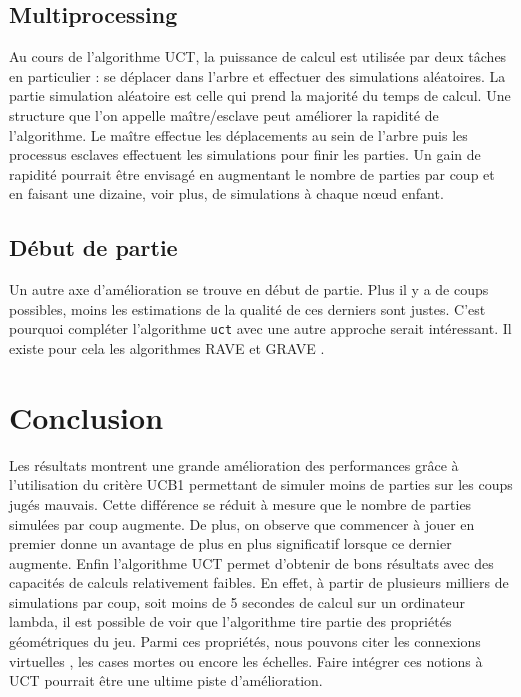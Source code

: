 \documentclass[a4paper]{article}
\theoremstyle{definition}
\begin{document}
\subsection{Multiprocessing}

Au cours de l'algorithme UCT, la puissance de calcul est utilisée par deux tâches en particulier : se déplacer dans l'arbre et effectuer des simulations aléatoires. La partie simulation aléatoire est celle qui prend la majorité du temps de calcul. Une structure que l'on appelle maître/esclave peut améliorer la rapidité de l'algorithme. Le maître effectue les déplacements au sein de l'arbre puis les processus esclaves effectuent les simulations pour finir les parties. Un gain de rapidité pourrait être envisagé en augmentant le nombre de parties par coup et en faisant une dizaine, voir plus, de simulations à chaque nœud enfant.

\subsection{Début de partie}

Un autre axe d'amélioration se trouve en début de partie. Plus il y a de coups possibles, moins les estimations de la qualité de ces derniers sont justes. C'est pourquoi compléter l'algorithme \texttt{uct} avec une autre approche serait intéressant. Il existe pour cela les algorithmes RAVE et GRAVE \cite{rave} \cite{grave}.

\newpage

\section{Conclusion}

Les résultats montrent une grande amélioration des performances grâce à l'utilisation du critère UCB1 permettant de simuler moins de parties sur les coups jugés mauvais. Cette différence se réduit à mesure que le nombre de parties simulées par coup augmente. De plus, on observe que commencer à jouer en premier donne un avantage de plus en plus significatif lorsque ce dernier augmente.
Enfin l'algorithme UCT permet d'obtenir de bons résultats avec des capacités de calculs relativement faibles. En effet, à partir de plusieurs milliers de simulations par coup, soit moins de 5 secondes de calcul sur un ordinateur lambda, il est possible de voir que l'algorithme tire partie des propriétés géométriques du jeu. Parmi ces propriétés, nous pouvons citer les connexions virtuelles , les cases mortes ou encore les échelles. Faire intégrer ces notions à UCT pourrait être une ultime piste d'amélioration.

\newpage

\listoffigures 

\newpage

\nocite{ref2}


\end{document}
